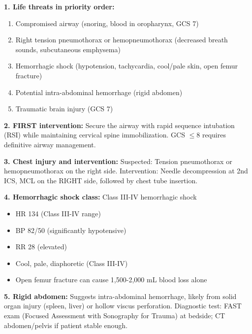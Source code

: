 \documentclass[11pt]{article}
\begin{document}
\vspace{3cm}

\begin{tcolorbox}[colback=green!5!white,colframe=green!75!black,title=Case Study 1 - Answers]

\textbf{1. Life threats in priority order:}
\begin{enumerate}
    \item Compromised airway (snoring, blood in oropharynx, GCS 7)
    \item Right tension pneumothorax or hemopneumothorax (decreased breath sounds, subcutaneous emphysema)
    \item Hemorrhagic shock (hypotension, tachycardia, cool/pale skin, open femur fracture)
    \item Potential intra-abdominal hemorrhage (rigid abdomen)
    \item Traumatic brain injury (GCS 7)
\end{enumerate}

\textbf{2. FIRST intervention:}
Secure the airway with rapid sequence intubation (RSI) while maintaining cervical spine immobilization. GCS $\leq$8 requires definitive airway management.

\textbf{3. Chest injury and intervention:}
Suspected: Tension pneumothorax or hemopneumothorax on the right side.
Intervention: Needle decompression at 2nd ICS, MCL on the RIGHT side, followed by chest tube insertion.

\textbf{4. Hemorrhagic shock class:}
Class III-IV hemorrhagic shock
\begin{itemize}
    \item HR 134 (Class III-IV range)
    \item BP 82/50 (significantly hypotensive)
    \item RR 28 (elevated)
    \item Cool, pale, diaphoretic (Class III-IV)
    \item Open femur fracture can cause 1,500-2,000 mL blood loss alone
\end{itemize}

\textbf{5. Rigid abdomen:}
Suggests intra-abdominal hemorrhage, likely from solid organ injury (spleen, liver) or hollow viscus perforation.
Diagnostic test: FAST exam (Focused Assessment with Sonography for Trauma) at bedside; CT abdomen/pelvis if patient stable enough.


\end{tcolorbox}
\end{document}
